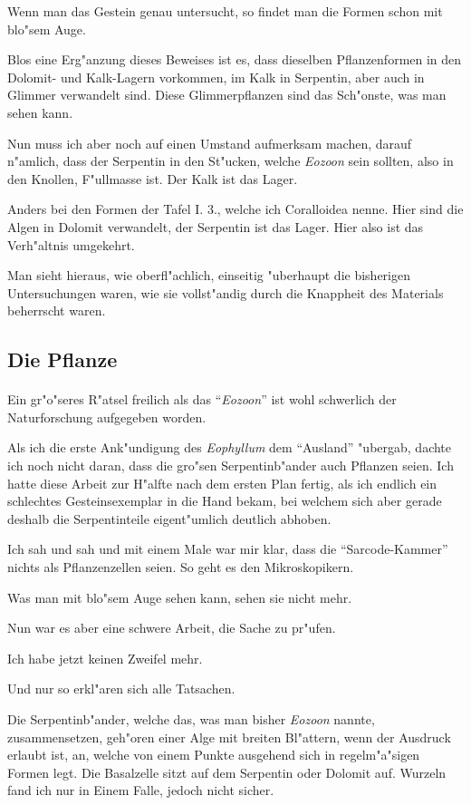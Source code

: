 \documentclass[a4paper, 11pt, oneside, german]{article}
\begin{document}
Wenn man das Gestein genau untersucht, so findet man die Formen schon mit blo"sem Auge.

Blos eine Erg"anzung dieses Beweises ist es, dass dieselben Pflanzenformen in den Dolomit- und Kalk-Lagern vorkommen, im Kalk in Serpentin, aber auch in Glimmer verwandelt sind. Diese Glimmerpflanzen sind das Sch"onste, was man sehen kann.

Nun muss ich aber noch auf einen Umstand aufmerksam machen, darauf n"amlich, dass der Serpentin in den St"ucken, welche \emph{Eozoon} sein sollten, also in den Knollen, F"ullmasse ist. Der Kalk ist das Lager.

Anders bei den Formen der Tafel I. 3., welche ich Coralloidea nenne. Hier sind die Algen in Dolomit verwandelt, der Serpentin ist das Lager. Hier also ist das Verh"altnis umgekehrt.

Man sieht hieraus, wie oberfl"achlich, einseitig "uberhaupt die bisherigen Untersuchungen waren, wie sie vollst"andig durch die Knappheit des Materials beherrscht waren.
\clearpage
\subsection{Die Pflanze}
\paragraph{}
Ein gr"o"seres R"atsel freilich als das "`\emph{Eozoon}"' ist wohl schwerlich der Naturforschung aufgegeben worden.

Als ich die erste Ank"undigung des \emph{Eophyllum} dem "`Ausland"' "ubergab, dachte ich noch nicht daran, dass die gro"sen Serpentinb"ander auch Pflanzen seien. Ich hatte diese Arbeit zur H"alfte nach dem ersten Plan fertig, als ich endlich ein schlechtes Gesteinsexemplar in die Hand bekam, bei welchem sich aber gerade deshalb die Serpentinteile eigent"umlich deutlich abhoben.

Ich sah und sah und mit einem Male war mir klar, dass die "`Sarcode-Kammer"' nichts als Pflanzenzellen seien. So geht es den Mikroskopikern.

Was man mit blo"sem Auge sehen kann, sehen sie nicht mehr.

Nun war es aber eine schwere Arbeit, die Sache zu pr"ufen.

Ich habe jetzt keinen Zweifel mehr.

Und nur so erkl"aren sich alle Tatsachen.

Die Serpentinb"ander, welche das, was man bisher \emph{Eozoon} nannte, zusammensetzen, geh"oren einer Alge mit breiten Bl"attern, wenn der Ausdruck erlaubt ist, an, welche von einem Punkte ausgehend sich in regelm"a"sigen Formen legt. Die Basalzelle sitzt auf dem Serpentin oder Dolomit auf. Wurzeln fand ich nur in Einem Falle, jedoch nicht sicher.
\end{document}
